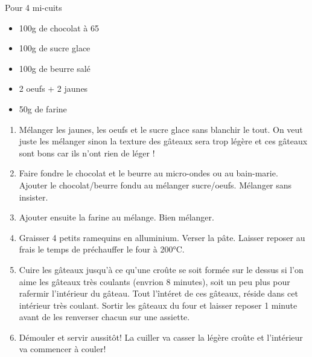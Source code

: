 \bigskip
{}
{Pour 4 mi-cuits}{\begin{itemize}
	\item 100g de chocolat à 65%
	\item 100g de sucre glace
	\item 100g de beurre salé
	\item 2 oeufs + 2 jaunes
	\item 50g de farine
\end{itemize}}
{\begin{enumerate}
	\item Mélanger les jaunes, les oeufs et le sucre glace sans blanchir le tout. On veut juste les mélanger sinon la texture des gâteaux sera trop légère et ces gâteaux sont bons car ils n'ont rien de léger !
	\item Faire fondre le chocolat et le beurre au micro-ondes ou au bain-marie. Ajouter le chocolat/beurre fondu au mélanger sucre/oeufs. Mélanger sans insister.
	\item Ajouter ensuite la farine au mélange. Bien mélanger.
	\item Graisser 4 petits ramequins en alluminium. Verser la pâte. Laisser reposer au frais le temps de préchauffer le four à 200°C.
	\item Cuire les gâteaux jusqu'à ce qu'une croûte se soit formée sur le dessus si l'on aime les gâteaux très coulants (envrion 8 minutes), soit un peu plus pour rafermir l'intérieur du gâteau. Tout l'întéret de ces gâteaux, réside dans cet intérieur très coulant. Sortir les gâteaux du four et laisser reposer 1 minute avant de les renverser chacun sur une assiette.
	\item Démouler et servir aussitôt! La cuiller va casser la légère croûte et l'intérieur va commencer à couler! 
\end{enumerate}}

